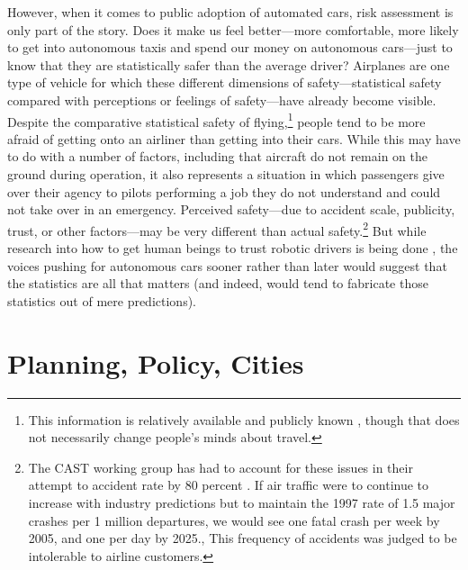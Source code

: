 However, when it comes to public adoption of automated cars,
risk assessment is only part of the story. Does it make us feel better---more
comfortable, more likely to get into autonomous taxis and spend our
money on autonomous cars---just to know that they are statistically safer
than the average driver? Airplanes are one type of vehicle for which
these different dimensions of 
safety---statistical safety compared with perceptions or feelings of
safety---have already become visible. Despite the comparative
statistical safety of flying,\footnote{This information is relatively
  available and publicly known \cite{airlinereporter}, though that does not
  necessarily change people's minds about travel.}
people tend to be more afraid of getting onto an airliner than getting into their
cars. While this may have to do with a number of factors,
including that aircraft do not remain on the ground during operation,
it also represents a situation in which passengers give over their
agency to pilots performing a job they do not understand and could not
take over in an emergency. Perceived safety---due to accident scale,
publicity, trust, or other factors---may be very different than actual
safety.\footnote{The CAST working group has had to account for these
  issues in their attempt to accident rate by 80 percent \cite[p.
    28]{PARCCAST}.
If air traffic were to continue to increase
with industry predictions but to maintain the 1997 rate of 1.5 major
crashes per 1 million departures, we would see one fatal crash per
week by 2005, and one per day by 2025.\cite{predictmorecrashes},
This frequency of accidents was judged to be intolerable to
airline customers.} But while research into how to get human beings to trust robotic drivers
is being done \cite{rossTrust}, the voices pushing for autonomous cars sooner
rather than later would suggest that the statistics are all that
matters (and indeed, would tend to fabricate those statistics out of
mere predictions). 


\section{Planning, Policy, Cities}



